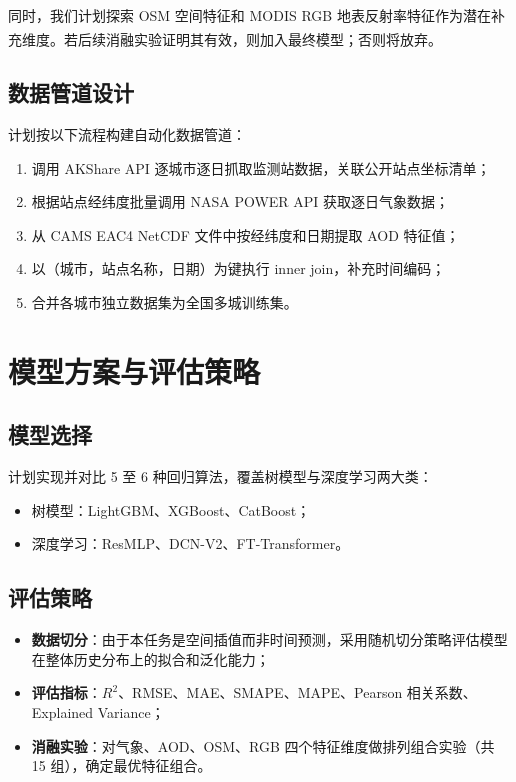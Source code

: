 \documentclass[UTF8,zihao=-4,a4paper]{ctexart}
\newcommand{\aodd}{AOD}
\let\oldcite\cite
\renewcommand{\cite}[1]{\textsuperscript{\oldcite{#1}}}
\begin{document}
同时，我们计划探索 OSM 空间特征和 MODIS RGB 地表反射率特征作为潜在补充维度\cite{li2017}。若后续消融实验证明其有效，则加入最终模型；否则将放弃。

\subsection{数据管道设计}

计划按以下流程构建自动化数据管道：

\begin{enumerate}
  \item 调用 AKShare API 逐城市逐日抓取监测站数据，关联公开站点坐标清单；
  \item 根据站点经纬度批量调用 NASA POWER API 获取逐日气象数据；
  \item 从 CAMS EAC4 NetCDF 文件中按经纬度和日期提取 \aodd{} 特征值；
  \item 以（城市，站点名称，日期）为键执行 inner join，补充时间编码；
  \item 合并各城市独立数据集为全国多城训练集。
\end{enumerate}

\section{模型方案与评估策略}

\subsection{模型选择}

计划实现并对比 5 至 6 种回归算法，覆盖树模型与深度学习两大类：

\begin{itemize}
  \item 树模型：LightGBM、XGBoost、CatBoost；
  \item 深度学习：ResMLP、DCN-V2、FT-Transformer。
\end{itemize}

\subsection{评估策略}

\begin{itemize}
  \item \textbf{数据切分}：由于本任务是空间插值而非时间预测，采用随机切分策略评估模型在整体历史分布上的拟合和泛化能力；
  \item \textbf{评估指标}：$R^2$、RMSE、MAE、SMAPE、MAPE、Pearson 相关系数、Explained Variance；
  \item \textbf{消融实验}：对气象、\aodd{}、OSM、RGB 四个特征维度做排列组合实验（共 15 组），确定最优特征组合。
\end{itemize}
\end{document}
